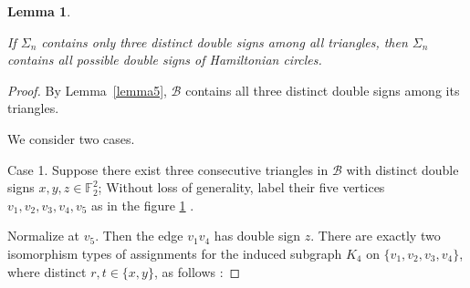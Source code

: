\documentclass[12pt]{amsart}
\theoremstyle{plain}
\newtheorem{lemma}[theorem]{Lemma}
\theoremstyle{definition}%
\begin{document}
\begin{lemma}\label{lemmab}
    

If \(\Sigma_n\) contains only three distinct  double signs among all triangles, then \(\Sigma_n\) contains all possible double signs of Hamiltonian circles.
\end{lemma}

\begin{proof}

By Lemma~\ref{lemma5}, \(\mathcal{B}\) contains all three distinct  double signs among its triangles. 

We consider two cases. 

Case 1. Suppose there exist three consecutive triangles in $\mathcal{B}$ with distinct double signs \(x,y,z\in\mathbb{F}_2^2\); Without loss of generality, label their five vertices \(v_1,v_2,v_3,v_4,v_5\) as in the figure \ref{three1} .                                                                                                                                      




\begin{figure}[H]
    \centering
{}
 \caption{}
\label{three1}

\end{figure}

Normalize at \(v_5\). Then the edge \(v_1v_4\) has double sign \(z\). 
There are exactly two isomorphism types of assignments for the induced subgraph \(K_4\) on \(\{v_1,v_2,v_3,v_4\}\), where distinct $r,t\in\{x,y\}$, as follows :




\end{proof}
\end{document}
